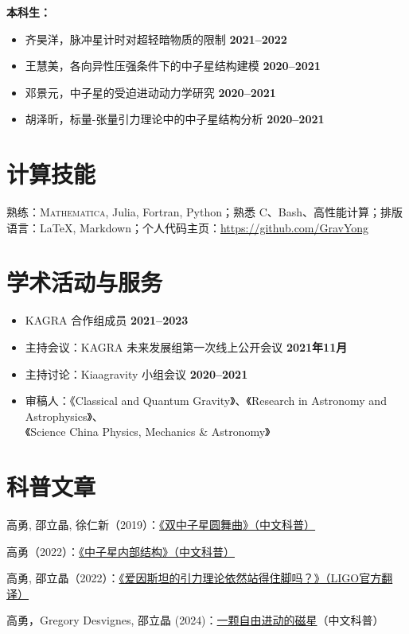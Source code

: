\documentclass[margin,line]{res_mod}
\begin{document}
\begin{resume}

\textbf{本科生：}
\begin{itemize}
  \item 齐昊洋，脉冲星计时对超轻暗物质的限制 \hfill \textbf{2021–2022}
  \item 王慧美，各向异性压强条件下的中子星结构建模 \hfill \textbf{2020–2021}
  \item 邓景元，中子星的受迫进动动力学研究 \hfill \textbf{2020–2021}
  \item 胡泽昕，标量-张量引力理论中的中子星结构分析 \hfill \textbf{2020–2021}
\end{itemize}


\section{计算技能}
熟练：\textsc{Mathematica}, Julia, Fortran, Python；熟悉 C、Bash、高性能计算；排版语言：\LaTeX, Markdown；个人代码主页：\url{https://github.com/GravYong}

\section{学术活动与服务}
\begin{itemize}
  \item KAGRA 合作组成员 \hfill \textbf{2021–2023}
  \item 主持会议：KAGRA 未来发展组第一次线上公开会议 \hfill \textbf{2021年11月}
  \item 主持讨论：Kiaagravity 小组会议 \hfill \textbf{2020–2021}
  \item 审稿人：《Classical and Quantum Gravity》、《Research in Astronomy and Astrophysics》、\\
  \phantom{审稿人：}《Science China Physics, Mechanics \& Astronomy》
\end{itemize}


\ifx\nopubs\undefined

\else
%
\fi

\section{科普文章}
\begin{etaremune}
\item 高勇, 邵立晶, 徐仁新（2019）：\href{https://gravyong.github.io/files/BNS_Popular.pdf}{《双中子星圆舞曲》（中文科普）}
\item 高勇（2022）：\href{https://gravyong.github.io/files/NS_Structure_Popular.pdf}{《中子星内部结构》（中文科普）}
\item 高勇, 邵立晶（2022）：\href{https://www.ligo.org/science/Publication-O3bTGR/translations/science-summary-chinese-simplified.pdf}{《爱因斯坦的引力理论依然站得住脚吗？》（LIGO官方翻译）}
\item 高勇，Gregory Desvignes, 邵立晶 (2024)：\href{https://pure.mpg.de/rest/items/item_3612895_2/component/file_3612896/content}{一颗自由进动的磁星}（中文科普）
\end{etaremune}


\end{resume}
\end{document}
